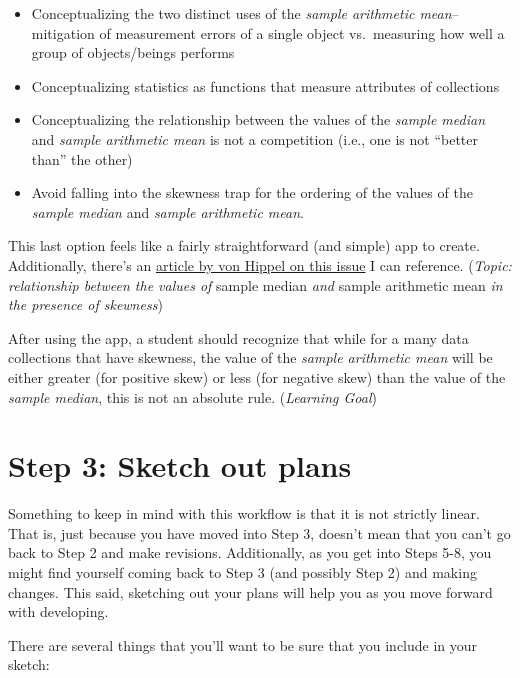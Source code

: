 \documentclass[
]{book}
\providecommand{\tightlist}{%
  \setlength{\itemsep}{0pt}\setlength{\parskip}{0pt}}
\begin{document}
\begin{itemize}
\tightlist
\item
  Conceptualizing the two distinct uses of the \emph{sample arithmetic mean}--mitigation of measurement errors of a single object vs.~measuring how well a group of objects/beings performs
\item
  Conceptualizing statistics as functions that measure attributes of collections
\item
  Conceptualizing the relationship between the values of the \emph{sample median} and \emph{sample arithmetic mean} is not a competition (i.e., one is not ``better than'' the other)
\item
  Avoid falling into the skewness trap for the ordering of the values of the \emph{sample median} and \emph{sample arithmetic mean}.
\end{itemize}

This last option feels like a fairly straightforward (and simple) app to create. Additionally, there's an \href{http://jse.amstat.org/v13n2/vonhippel.html}{article by von Hippel on this issue} I can reference. (\emph{Topic: relationship between the values of }sample median \emph{and} sample arithmetic mean \emph{in the presence of skewness})

After using the app, a student should recognize that while for a many data collections that have skewness, the value of the \emph{sample arithmetic mean} will be either greater (for positive skew) or less (for negative skew) than the value of the \emph{sample median}, this is not an absolute rule. (\emph{Learning Goal})

\hypertarget{step3}{%
\section{Step 3: Sketch out plans}\label{step3}}

Something to keep in mind with this workflow is that it is not strictly linear. That is, just because you have moved into Step 3, doesn't mean that you can't go back to Step 2 and make revisions. Additionally, as you get into Steps 5-8, you might find yourself coming back to Step 3 (and possibly Step 2) and making changes. This said, sketching out your plans will help you as you move forward with developing.

There are several things that you'll want to be sure that you include in your sketch:
\end{document}
